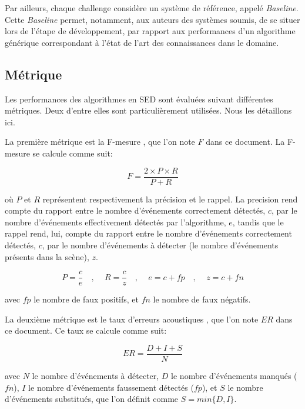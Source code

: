 Par ailleurs, chaque challenge considère un système de référence, appelé \emph{Baseline}. Cette \emph{Baseline} permet, notamment, aux auteurs des systèmes soumis, de se situer lors de l'étape de développement, par rapport aux performances d'un algorithme générique correspondant à l'état de l'art des connaissances dans le domaine.

\subsection{Métrique}
\label{sec:ch6_metriqueAED}

Les performances des algorithmes en SED sont évaluées suivant différentes métriques. Deux d'entre elles sont particulièrement utilisées. Nous les détaillons ici.

La première métrique est la F-mesure \citep{Giannoulis2013database,giannoulis2013detection,Stowell15}, que l'on note $F$ dans ce document. La F-mesure se calcule comme suit:

\begin{equation}
F=\dfrac{2\times P \times R}{P+R}
\end{equation}

où $P$ et $R$ représentent respectivement la précision et le rappel. La precision rend compte du rapport entre le nombre d'événements correctement détectés, $c$, par le nombre d'événements effectivement détectés par l'algorithme, $e$, tandis que le rappel rend, lui, compte du rapport entre le nombre d'événements correctement détectés, $c$, par le nombre d'événements à détecter (le nombre d'événements présents dans la scène), $z$.

\begin{equation}
P=\dfrac{c}{e}  \quad \textrm{, } \quad R=\dfrac{c}{z} \quad \textrm{, } \quad  e=c+fp \quad \textrm{, } \quad  z=c+fn
\end{equation}

avec $fp$ le nombre de faux positifs, et $fn$ le nombre de faux négatifs.

La deuxième métrique est le taux d'erreurs acoustiques \citep{poliner2007discriminative,clear}, que l'on note $ER$ dans ce document. Ce taux se calcule comme suit:

\begin{equation}
ER=\dfrac{D+I+S}{N}
\end{equation}

avec $N$ le nombre d'événements à détecter, $D$ le nombre d'événements manqués ($fn$), $I$ le nombre d'événements faussement détectés ($fp$), et $S$ le nombre d'événements substitués, que l'on définit comme $S=min\lbrace D,I\rbrace$.

